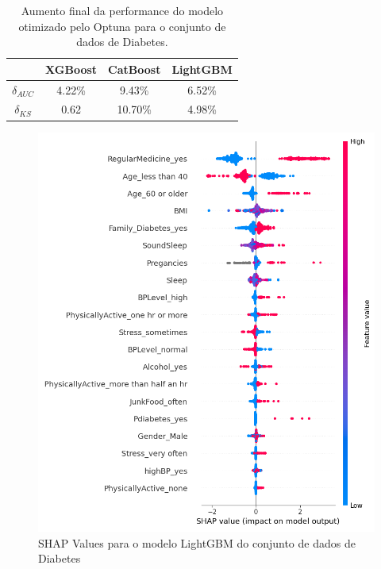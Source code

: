 \begin{table}[H]
\centering
\begin{tabular}{|c|c|c|c|}
\hline
	& \textbf{XGBoost} &\textbf{CatBoost} & \textbf{LightGBM} \\
\hline
$\delta_{AUC}$	& 4.22\% & 9.43\%	   &     6.52\% \\
\hline
$\delta_{KS}$	&   0.62 	&  10.70\% &	4.98\%\\
\hline
\end{tabular}
\caption{Aumento final da performance do modelo otimizado pelo Optuna para o conjunto de dados de Diabetes.}\label{res:fin:dia}
\end{table}

\begin{figure}[H]
 \caption{SHAP Values para o modelo LightGBM do conjunto de dados de Diabetes}
 \label{shap:fin:dia}
 \centering
 \includegraphics[scale=0.5]{images/shap_lgbm_diabete.png}
\end{figure}


